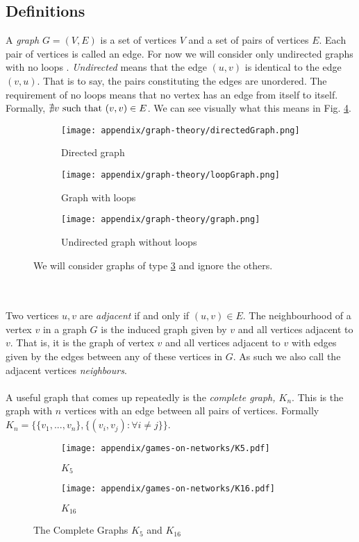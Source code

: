\subsection{Definitions}
A \textit{graph} $G=(V,E)$ is a set of vertices $V$ and a set of pairs of vertices $E$. Each pair of vertices is called an edge. For now we will consider only undirected graphs with no loops . \textit{Undirected} means that the edge $(u,v)$ is identical to the edge $(v,u)$. That is to say, the pairs constituting the edges are unordered\cite{graph-theory-reference}. The requirement of no loops means that no vertex has an edge from itself to itself. Formally, $\nexists v\textnormal{ such that } (v,v)\in E$. We can see visually what this means in Fig. \ref{fig:example-graphs}.
\begin{figure}
	\centering
	\begin{subfigure}{.3\textwidth}
		\centering
		\texttt{[image: appendix/graph-theory/directedGraph.png]}
		\caption{Directed graph}
		\label{fig:dir}
	\end{subfigure}%
	\begin{subfigure}{.3\textwidth}
		\centering
		\texttt{[image: appendix/graph-theory/loopGraph.png]}
		\caption{Graph with loops}
		\label{fig:loop}
	\end{subfigure}
	\begin{subfigure}{.3\textwidth}
		\centering
		\texttt{[image: appendix/graph-theory/graph.png]}
		\caption{Undirected graph without loops}
		\label{fig:undirected}
	\end{subfigure}
	\caption{We will consider graphs of type \ref{fig:undirected} and ignore the others.}
	\label{fig:example-graphs}
\end{figure}
\\
\\
Two vertices $u,v$ are \textit{adjacent} if and only if $(u,v)\in E$. The neighbourhood of a vertex $v$ in a graph $G$ is the induced graph given by $v$ and all vertices adjacent to $v$. That is, it is the graph of vertex $v$ and all vertices adjacent to $v$ with edges given by the edges between any of these vertices in $G$. As such we also call the adjacent vertices \textit{neighbours}.\\
\\
A useful graph that comes up repeatedly is the \textit{complete graph, $K_n$}. This is the graph with $n$ vertices with an edge between all pairs of vertices. Formally $K_n=\{\{v_1,...,v_n\},\{(v_i,v_j):\forall i\neq j\}\}$.
\begin{figure}
	\centering
	\begin{subfigure}{.5\textwidth}
		\centering
		\texttt{[image: appendix/games-on-networks/K5.pdf]}
		\caption{$K_5$}
		\label{fig:K5}
	\end{subfigure}%
	\begin{subfigure}{.5\textwidth}
		\centering
		\texttt{[image: appendix/games-on-networks/K16.pdf]}
		\caption{$K_{16}$}
		\label{fig:K16}
	\end{subfigure}
	\caption{The Complete Graphs $K_5$ and $K_{16}$}
	\label{fig:complete-graphs}
\end{figure}
